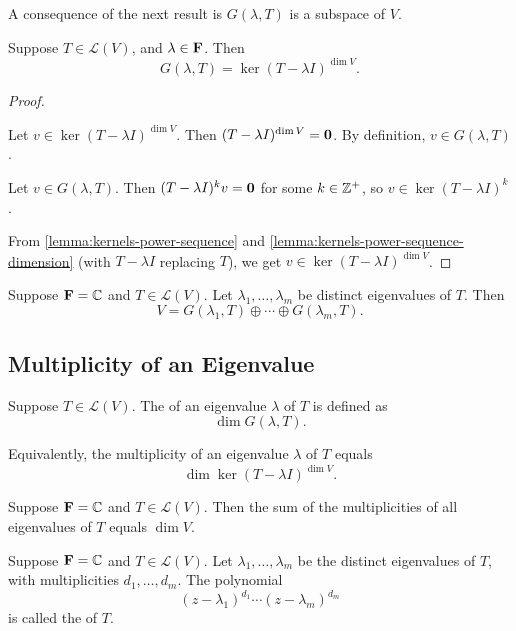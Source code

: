 A consequence of the next result is $G(\lambda,T)$ is a subspace of $V$.

\begin{lemma}
Suppose $T\in\mathcal{L}(V)$, and $\lambda\in\mathbf F$. Then
\[G(\lambda,T)=\ker(T-\lambda I)^{\dim V}.\]
\end{lemma}

\begin{proof} \

\fbox{$\supset$} Let $v\in\ker(T-\lambda I)^{\dim V}$. Then $(T-\lambda I)^{\dim V}=\vb{0}$. By definition, $v\in G(\lambda,T)$.

\fbox{$\subset$} Let $v\in G(\lambda,T)$. Then $(T-\lambda I)^k v=\vb{0}$ for some $k\in\mathbb Z^+$, so $v\in\ker(T-\lambda I)^k$. 

From \ref{lemma:kernels-power-sequence} and \ref{lemma:kernels-power-sequence-dimension} (with $T-\lambda I$ replacing $T$), we get $v\in\ker(T-\lambda I)^{\dim V}$. 
\end{proof}

\begin{theorem}
Suppose $\mathbf F=\mathbb C$ and $T\in\mathcal{L}(V)$. Let $\lambda_1,\dots,\lambda_m$ be distinct eigenvalues of $T$. Then
\begin{equation}
V=G(\lambda_1,T)\oplus\cdots\oplus G(\lambda_m,T).
\end{equation}
\end{theorem}

\subsection{Multiplicity of an Eigenvalue}
\begin{definition}[Multiplicity]
Suppose $T\in\mathcal{L}(V)$. The  of an eigenvalue $\lambda$ of $T$ is defined as
\[\dim G(\lambda,T).\]
\end{definition}

Equivalently, the multiplicity of an eigenvalue $\lambda$ of $T$ equals
\[\dim\ker(T-\lambda I)^{\dim V}.\]

\begin{lemma}
Suppose $\mathbf F=\mathbb C$ and $T\in\mathcal{L}(V)$. Then the sum of the multiplicities of all eigenvalues of $T$ equals $\dim V$.
\end{lemma}

\begin{definition}
Suppose $\mathbf F=\mathbb C$ and $T\in\mathcal{L}(V)$. Let $\lambda_1,\dots,\lambda_m$ be the distinct eigenvalues of $T$, with multiplicities $d_1,\dots,d_m$. The polynomial
\[(z-\lambda_1)^{d_1}\cdots(z-\lambda_m)^{d_m}\]
is called the  of $T$.
\end{definition}

